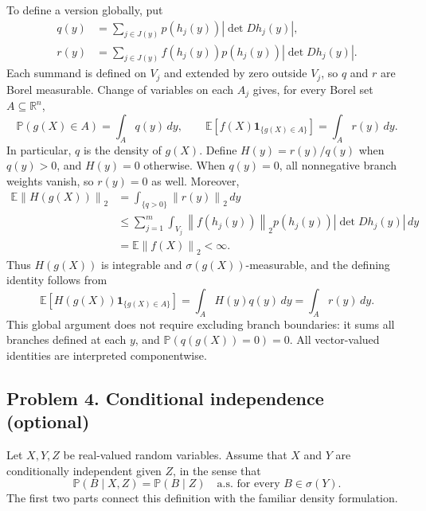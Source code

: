 \documentclass[lang=en,11pt,a4paper,citestyle=authoryear]{elegantpaper}
\newcommand{\R}{\mathbb{R}}
\newcommand{\E}{\mathbb{E}}
\renewcommand{\P}{\mathbb{P}}
\newcommand{\norm}[1]{\left\lVert#1\right\rVert}
\begin{document}
\begin{enumerate}[label=(\arabic*),leftmargin=*]
To define a version globally, put
\[
\begin{aligned}
q(y)&=\sum_{j\in J(y)}p(h_j(y))|\det Dh_j(y)|,\\
r(y)&=\sum_{j\in J(y)}f(h_j(y))p(h_j(y))|\det Dh_j(y)|.
\end{aligned}
\]
Each summand is defined on $V_j$ and extended by zero outside $V_j$, so $q$ and $r$ are Borel measurable. Change of variables on each $A_j$ gives, for every Borel set $A\subseteq\R^n$,
\[
\P(g(X)\in A)=\int_A q(y)\,dy,\qquad
\E[f(X)\mathbf{1}_{\{g(X)\in A\}}]=\int_A r(y)\,dy.
\]
In particular, $q$ is the density of $g(X)$. Define $H(y)=r(y)/q(y)$ when $q(y)>0$, and $H(y)=0$ otherwise. When $q(y)=0$, all nonnegative branch weights vanish, so $r(y)=0$ as well. Moreover,
\[
\begin{aligned}
\E\norm{H(g(X))}_2
&=\int_{\{q>0\}}\norm{r(y)}_2\,dy\\
&\leq\sum_{j=1}^m\int_{V_j}\norm{f(h_j(y))}_2
p(h_j(y))|\det Dh_j(y)|\,dy\\
&=\E\norm{f(X)}_2<\infty.
\end{aligned}
\]
Thus $H(g(X))$ is integrable and $\sigma(g(X))$-measurable, and the defining identity follows from
\[
\E[H(g(X))\mathbf{1}_{\{g(X)\in A\}}]
=\int_A H(y)q(y)\,dy=\int_A r(y)\,dy.
\]
This global argument does not require excluding branch boundaries: it sums all branches defined at each $y$, and $\P(q(g(X))=0)=0$. All vector-valued identities are interpreted componentwise.

\end{enumerate}

\newpage
\subsection*{Problem 4. Conditional independence (optional)}
Let $X,Y,Z$ be real-valued random variables. Assume that $X$ and $Y$ are conditionally independent given $Z$, in the sense that
\[
\P(B\mid X,Z)=\P(B\mid Z)\quad\text{a.s. for every }B\in\sigma(Y).
\]
The first two parts connect this definition with the familiar density formulation.
\end{document}
